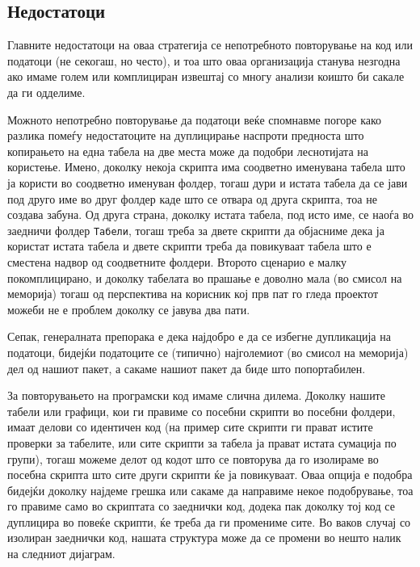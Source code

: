 \documentclass[
]{book}
\begin{document}
\hypertarget{ux43dux435ux434ux43eux441ux442ux430ux442ux43eux446ux438}{%
\subsection{Недостатоци}\label{ux43dux435ux434ux43eux441ux442ux430ux442ux43eux446ux438}}

Главните недостатоци на оваа стратегија се непотребното повторување на код или податоци (не секогаш, но често), и тоа што оваа организација станува незгодна ако имаме голем или комплициран извештај со многу анализи коишто би сакале да ги одделиме.

Можното непотребно повторување да податоци веќе спомнавме погоре како разлика помеѓу недостатоците на дуплицирање наспроти предноста што копирањето на една табела на две места може да подобри леснотијата на користење. Имено, доколку некоја скрипта има соодветно именувана табела што ја користи во соодветно именуван фолдер, тогаш дури и истата табела да се јави под друго име во друг фолдер каде што се отвара од друга скрипта, тоа не создава забуна. Од друга страна, доколку истата табела, под исто име, се наоѓа во заедничи фолдер \texttt{Табели}, тогаш треба за двете скрипти да објасниме дека ја користат истата табела и двете скрипти треба да повикуваат табела што е сместена надвор од соодветните фолдери. Второто сценарио е малку покомплицирано, и доколку табелата во прашање е доволно мала (во смисол на меморија) тогаш од перспектива на корисник кој прв пат го гледа проектот можеби не е проблем доколку се јавува два пати.

Сепак, генералната препорака е дека најдобро е да се избегне дупликација на податоци, бидејќи податоците се (типично) најголемиот (во смисол на меморија) дел од нашиот пакет, а сакаме нашиот пакет да биде што попортабилен.

За повторувањето на програмски код имаме слична дилема. Доколку нашите табели или графици, кои ги правиме со посебни скрипти во посебни фолдери, имаат делови со идентичен код (на пример сите скрипти ги прават истите проверки за табелите, или сите скрипти за табела ја прават истата сумација по групи), тогаш можеме делот од кодот што се повторува да го изолираме во посебна скрипта што сите други скрипти ќе ја повикуваат. Оваа опција е подобра бидејќи доколку најдеме грешка или сакаме да направиме некое подобрување, тоа го правиме само во скриптата со заеднички код, додека пак доколку тој код се дуплицира во повеќе скрипти, ќе треба да ги промениме сите. Во ваков случај со изолиран заеднички код, нашата структура може да се промени во нешто налик на следниот дијаграм.
\end{document}
